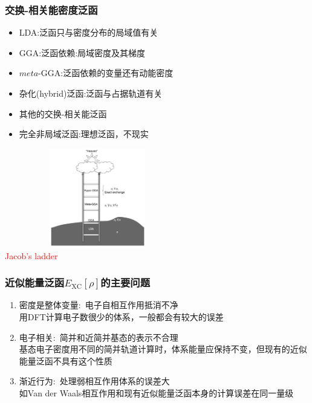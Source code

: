 \documentclass[cjk,slidestop,compress,mathserif,blue]{beamer}
\begin{document}
\frame                               %
{
\frametitle{交换-相关能密度泛函}
\begin{minipage}[b]{0.72\linewidth}
 \hspace*{-15pt}
 \begin{itemize}%
	 \setlength{\itemsep}{10pt}
 \item \textrm{LDA}:泛函只与密度分布的局域值有关
 \item \textrm{GGA}:泛函依赖:局域密度及其梯度
 \item $meta$-\textrm{GGA}:泛函依赖的变量还有动能密度
 \item 杂化(\textrm{hybrid})泛函:泛函与占据轨道有关
 \item 其他的交换-相关能泛函
 \item<1-> 完全非局域泛函:理想泛函，不现实
 \end{itemize}
\end{minipage}
\hfill
\begin{minipage}[b]{0.26\linewidth}
\hspace*{-10pt}
\includegraphics[height=1.7in,width=3.18in,viewport=10 5 1380 700,clip]{Figures/Jacobi-ladder.png}\\
{\small \textcolor{red}{\textrm{Jacob's ladder}}}
\end{minipage}
}

\frame                               %
{
	\frametitle{近似能量泛函$E_{\mathrm{XC}}[\rho]$的主要问题}
\vskip 20pt
\begin{enumerate}%
   \setlength{\itemsep}{10pt}
 \item  密度是整体变量:~电子自相互作用抵消不净\\%
	 用\textrm{DFT}计算电子数很少的体系，一般都会有较大的误差
 \item  电子相关:~简并和近简并基态的表示不合理\\
	 基态电子密度用不同的简并轨道计算时，体系能量应保持不变，但现有的近似能量泛函不具有这个性质
 \item  渐近行为:~处理弱相互作用体系的误差大\\
	 如\textrm{Van der Waals}相互作用和现有近似能量泛函本身的计算误差在同一量级
 \end{enumerate}
}
\end{document}
